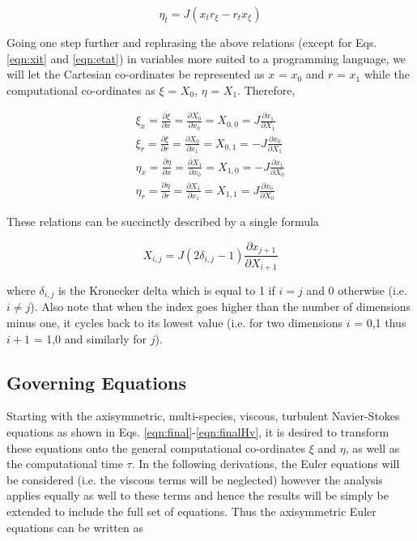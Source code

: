 \begin{equation}
	\eta_t = J(x_t r_\xi - r_t x_\xi)
\label{eqn:etat}
\end{equation}

	Going one step further and rephrasing the above relations (except for Eqs. \ref{eqn:xit} and \ref{eqn:etat}) 
in variables more suited to a programming
language, we will let the Cartesian co-ordinates be represented as $x$ = $x_0$ and $r$ = $x_1$ while the 
computational co-ordinates as $\xi$ = $X_0$, $\eta$ = $X_1$.  Therefore,

\begin{displaymath}
	\begin{array}{c}
	\xi_x = \frac{\partial \xi}{\partial x} = \frac{\partial X_0}{\partial x_0} = X_{0,0} = 
		J \frac{\partial x_1}{\partial X_1} \\
	\xi_r = \frac{\partial \xi}{\partial r} = \frac{\partial X_0}{\partial x_1} = X_{0,1} = 
		-J \frac{\partial x_0}{\partial X_1} \\
	\eta_x = \frac{\partial \eta}{\partial x} = \frac{\partial X_1}{\partial x_0} = X_{1,0} = 
		-J \frac{\partial x_1}{\partial X_0} \\
	\eta_r = \frac{\partial \eta}{\partial r} = \frac{\partial X_1}{\partial x_1} = X_{1,1} = 
		J \frac{\partial x_0}{\partial X_0} 
	\end{array}
\end{displaymath}

	These relations can be succinctly described by a single formula 

\begin{equation}
	X_{i,j} = J(2\delta_{i,j} -1)\frac{\partial x_{j+1}}{\partial X_{i+1}}
\label{eqn:metrics}
\end{equation}

	where $\delta_{i,j}$ is the Kronecker delta which is equal to 1 if $i = j$ and 0 
otherwise (i.e. $i \neq j$).  Also note that when the index goes higher than the number of dimensions
minus one, it cycles back to its lowest value (i.e. for two dimensions $i$ = 0,1 thus $i+1$ = 1,0 and
similarly for $j$).

\subsection{Governing Equations} 

	Starting with the axisymmetric, multi-species, viscous, turbulent Navier-Stokes equations as
shown in Eqs. \ref{eqn:final}-\ref{eqn:finalHv}, it is desired to transform these 
equations onto the general computational co-ordinates $\xi$ and $\eta$, as well as the computational time
$\tau$.  In the following derivations, the Euler equations will be considered (i.e. the viscous terms will be
neglected) however the analysis applies equally as well to these terms and hence the results will be simply be 
extended to include the full set of equations.  Thus the axisymmetric Euler equations can be written as

